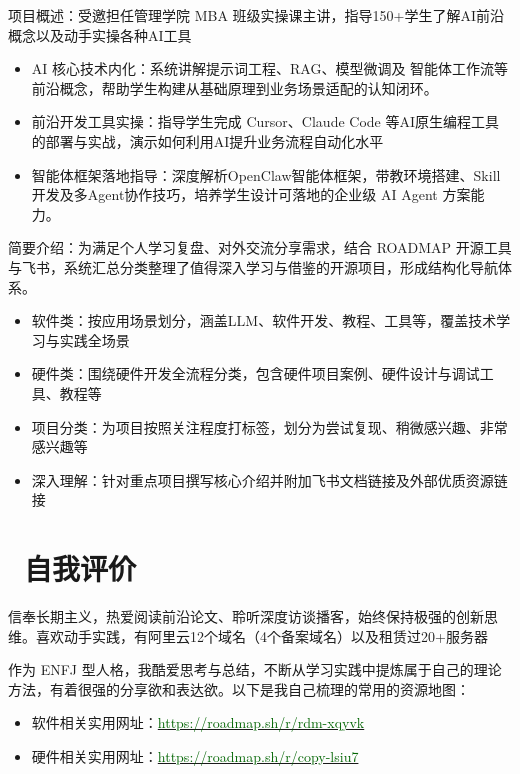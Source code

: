 \documentclass{resume} %
\begin{document}
	\large {项目概述：受邀担任管理学院 MBA 班级实操课主讲，指导150+学生了解AI前沿概念以及动手实操各种AI工具}
	\begin{itemize}
		\item AI 核心技术内化：系统讲解提示词工程、RAG、模型微调及 智能体工作流等前沿概念，帮助学生构建从基础原理到业务场景适配的认知闭环。
		\item 前沿开发工具实操：指导学生完成 Cursor、Claude Code 等AI原生编程工具的部署与实战，演示如何利用AI提升业务流程自动化水平
		\item 智能体框架落地指导：深度解析OpenClaw智能体框架，带教环境搭建、Skill开发及多Agent协作技巧，培养学生设计可落地的企业级 AI Agent 方案能力。
	\end{itemize}
	
	\large {简要介绍：为满足个人学习复盘、对外交流分享需求，结合 ROADMAP 开源工具与飞书，系统汇总分类整理了值得深入学习与借鉴的开源项目，形成结构化导航体系。}
	\begin{itemize}
		\item 软件类：按应用场景划分，涵盖LLM、软件开发、教程、工具等，覆盖技术学习与实践全场景
		\item 硬件类：围绕硬件开发全流程分类，包含硬件项目案例、硬件设计与调试工具、教程等
		\item 项目分类：为项目按照关注程度打标签，划分为尝试复现、稍微感兴趣、非常感兴趣等
		\item 深入理解：针对重点项目撰写核心介绍并附加飞书文档链接及外部优质资源链接
	\end{itemize}	
	
	\section{\faUser\ 自我评价}
	\hspace{2em}信奉长期主义，热爱阅读前沿论文、聆听深度访谈播客，始终保持极强的创新思维。喜欢动手实践，有阿里云12个域名（4个备案域名）以及租赁过20+服务器
	
	\hspace{2em}作为 ENFJ 型人格，我酷爱思考与总结，不断从学习实践中提炼属于自己的理论方法，有着很强的分享欲和表达欲。以下是我自己梳理的常用的资源地图：
	\begin{itemize}[parsep=0.5ex, leftmargin=1.5em]
	    \item 软件相关实用网址：\href{https://roadmap.sh/r/rdm-xqyvk}{\textcolor{darkgreen}{https://roadmap.sh/r/rdm-xqyvk}}
	    \item 硬件相关实用网址：\href{https://roadmap.sh/r/copy-lsiu7}{\textcolor{darkgreen}{https://roadmap.sh/r/copy-lsiu7}}
	\end{itemize}
\end{document}
